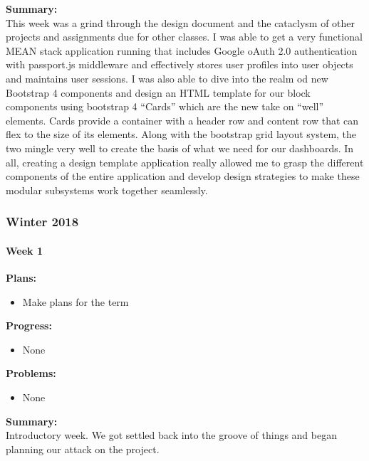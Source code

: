 \begin{adjustwidth}{2.5em}{0pt}
    \vspace{-0.3cm}\noindent\textbf{Summary:}\\
    \noindent This week was a grind through the design document and the cataclysm of other projects and assignments due for other classes. I was able to get a very functional MEAN stack application running that includes Google oAuth 2.0 authentication with passport.js middleware and effectively stores user profiles into user objects and maintains user sessions. I was also able to dive into the realm od new Bootstrap 4 components and design an HTML template for our block components using bootstrap 4 ``Cards'' which are the new take on ``well'' elements. Cards provide a container with a header row and content row that can flex to the size of its elements. Along with the bootstrap grid layout system, the two mingle very well to create the basis of what we need for our dashboards. In all, creating a design template application really allowed me to grasp the different components of the entire application and develop design strategies to make these modular subsystems work together seamlessly.
\end{adjustwidth} 
\subsubsection{Winter 2018}
\paragraph{Week 1}
\begin{adjustwidth}{2.5em}{0pt}
    \vspace{-0.5cm}\textbf{Plans:}
    \vspace{-0.5cm}
    \begin{itemize}
        \item Make plans for the term 
    \end{itemize} 
    \vspace{-0.3cm}\textbf{Progress:}
    \vspace{-0.5cm}
    \begin{itemize}
        \item None
    \end{itemize} 
    \vspace{-0.3cm}\textbf{Problems:}
    \vspace{-0.5cm}
    \begin{itemize}
        \item None
    \end{itemize}  
    \vspace{-0.3cm}\noindent\textbf{Summary:}\\
    \noindent Introductory week. We got settled back into the groove of things and began planning our attack on the project. 
\end{adjustwidth}
